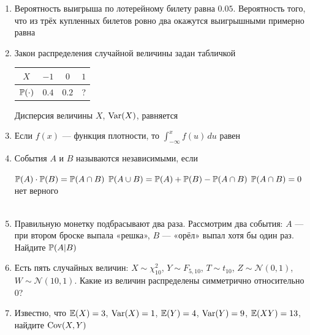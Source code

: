 \documentclass[12pt, a4paper]{article}\usepackage[]{graphicx}\usepackage[]{color}
\newcommand{\cN}{\mathcal{N}}
\begin{document}
\begin{enumerate}


\item Вероятность выигрыша по лотерейному билету равна $0.05$. Вероятность того, что из трёх купленных билетов ровно два окажутся выигрышными примерно равна


\item Закон распределения случайной величины задан табличкой

\begin{tabular}{@{}cccc@{}}
\toprule
$X$         & $-1$  & $0$   & $1$ \\ \midrule
$\P(\cdot)$ & $0.4$ & $0.2$ & ?   \\ \bottomrule
\end{tabular}

Дисперсия величины $X$, $\Var(X)$, равняется


\item Если $f(x)$ — функция плотности, то $\int_{-\infty}^{x}f(u)\,du$ равен


\item События $A$ и $B$ называются независимыми, если

{$\P(A)\cdot\P(B)=\P(A\cap B)$}
{$\P(A\cup B)=\P(A)+\P(B)-\P(A\cap B)$}
{$\P(A\cap B)=0$}
{нет верного} \\ \\

\item Правильную монетку подбрасывают два раза. Рассмотрим два события: $A$ — при втором броске выпала «решка», $B$ — «орёл» выпал хотя бы один раз. Найдите $\P(A|B)$


\item Есть пять случайных величин: $X\sim \chi^2_{10}$, $Y\sim F_{5,10}$, $T\sim t_{10}$, $Z\sim \cN(0,1)$, $W\sim \cN(10,1)$. Какие из величин распределены симметрично относительно 0?


\item Известно, что $\E(X)=3$, $\Var(X)=1$, $\E(Y)=4$, $\Var(Y)=9$, $\E(XY)=13$, найдите $\Cov(X,Y)$


\end{enumerate}
\end{document}
